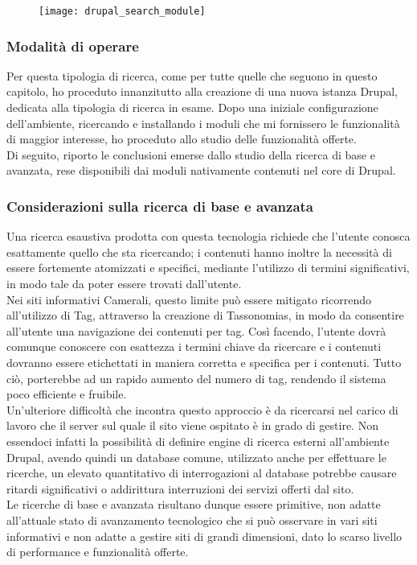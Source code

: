 		\begin{figure}[htbp]
			\begin{center}
				\texttt{[image: drupal\_search\_module]}
			\end{center}
		\end{figure}
	
			\subsubsection{Modalità di operare}
			Per questa tipologia di ricerca, come per tutte quelle che seguono in questo capitolo, ho proceduto innanzitutto alla creazione di una nuova istanza \gls{Drupal}, dedicata alla tipologia di ricerca in esame. Dopo una iniziale configurazione dell'ambiente, ricercando e installando i moduli che mi fornissero le funzionalità di maggior interesse, ho proceduto allo studio delle funzionalità offerte. \\
			Di seguito, riporto le conclusioni emerse dallo studio della ricerca di base e avanzata, rese disponibili dai moduli nativamente contenuti nel core di \gls{Drupal}.

			\subsubsection{Considerazioni sulla ricerca di base e avanzata}
			Una ricerca esaustiva prodotta con questa tecnologia richiede che l'utente conosca esattamente quello che sta ricercando; i contenuti hanno inoltre la necessità di essere fortemente atomizzati e specifici, mediante l'utilizzo di termini significativi, in modo tale da poter essere trovati dall'utente. \\
			Nei siti informativi Camerali, questo limite può essere mitigato ricorrendo all'utilizzo di \gls{Tag}, attraverso la creazione di \glspl{Tassonomia}, in modo da consentire all'utente una navigazione dei contenuti per tag. Così facendo, l'utente dovrà comunque conoscere con esattezza i termini chiave da ricercare e i contenuti dovranno essere etichettati in maniera corretta e specifica per i contenuti. Tutto ciò, porterebbe ad un rapido aumento del numero di tag, rendendo il sistema poco efficiente e fruibile. \\
			Un'ulteriore difficoltà che incontra questo approccio è da ricercarsi nel carico di lavoro che il server sul quale il sito viene ospitato è in grado di gestire. Non essendoci infatti la possibilità di definire engine di ricerca esterni all'ambiente \gls{Drupal}, avendo quindi un database comune, utilizzato anche per effettuare le ricerche, un elevato quantitativo di interrogazioni al database potrebbe causare ritardi significativi o addirittura interruzioni dei servizi offerti dal sito. \\
			Le ricerche di base e avanzata risultano dunque essere primitive, non adatte all'attuale stato di avanzamento tecnologico che si può osservare in vari siti informativi e non adatte a gestire siti di grandi dimensioni, dato lo scarso livello di performance e funzionalità offerte.
		
